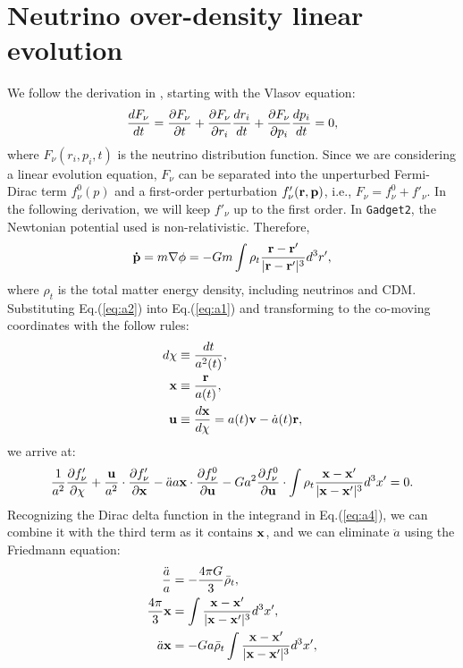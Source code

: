 \section{Neutrino over-density linear evolution }
\label{app:phi}
We follow the derivation in \cite{Carton, LBE},  starting with the Vlasov equation:
\begin{equation}
\label{eq:a1}
    \frac{dF_\nu}{dt} = \pdv{F_\nu}{t} + \pdv{F_\nu}{r_i} \frac{dr_i}{dt} + \pdv{F_\nu}{p_i} \frac{dp_i}{dt} = 0,
\end{equation}
where $F_\nu(r_i,p_i,t)$ is the neutrino distribution function. Since we are considering a linear evolution equation, $F_\nu$ can be separated into the unperturbed Fermi-Dirac term $f_\nu^0(p)$ and a first-order perturbation $f'_\nu(\bold r, \bold p)$, i.e., $F_\nu = f_\nu^0 + f'_\nu$. In the following derivation, we will keep $f'_\nu$ up to the first order. In \texttt{Gadget2}, the Newtonian potential used is non-relativistic. Therefore,
\begin{equation}
\label{eq:a2}
    \bold{\dot p} = m \nabla \phi = -Gm \int \rho_t \frac{\bold{r - r'}}{|\bold{r-r'}|^3 } d^3r',
\end{equation}
where $\rho_t$ is the total matter energy density, including neutrinos and CDM. Substituting Eq.(\ref{eq:a2}) into Eq.(\ref{eq:a1}) and transforming to the co-moving coordinates with the follow rules:
\begin{align}
    d\chi &\equiv \frac{dt}{a^2(t)} \nonumber, \\
    \bold x &\equiv \frac{\bold r}{a(t)}, \\
    \bold u &\equiv \frac{d \bold x}{d\chi} = a(t) \bold v - \dot a(t) \bold r \nonumber,
\end{align}
we arrive at:
\begin{equation}
\label{eq:a4}
    \frac{1}{a^2}\pdv{f'_\nu}{\chi} + \frac{\bold u}{a^2} \cdot \pdv{f'_\nu}{\bold x} - \ddot a a \bold x \cdot \pdv{f_\nu^0}{\bold u} - Ga^2 \pdv{f_\nu^0}{\bold u} \cdot \int \rho_t \frac{\bold{x - x'}}{|\bold{x-x'}|^3 } d^3x' = 0.
\end{equation}
Recognizing the Dirac delta function in the integrand in Eq.(\ref{eq:a4}), we can combine it with the third term as it contains $\bold x$, and we can eliminate $\ddot a$ using the Friedmann equation:
\begin{align}
\label{eq:a5}
    \frac{\ddot a}{a} &= - \frac{4\pi G}{3} \bar \rho_t \nonumber,\\
    \frac{4\pi}{3} \bold x &= \int \frac{\bold{x - x'}}{|\bold{x-x'}|^3 } d^3x' \nonumber ,\\
    \ddot a \bold x &= -Ga \bar \rho_t \int \frac{\bold{x - x'}}{|\bold{x-x'}|^3 } d^3x',
\end{align}
